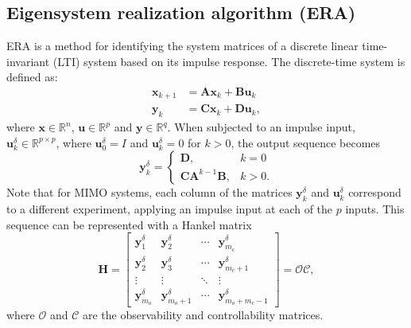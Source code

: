 \documentclass[../main.tex]{subfiles}
\begin{document}
\subsection{Eigensystem realization algorithm (ERA)}

ERA is a method for identifying the system matrices of a discrete linear time-invariant (LTI) system based on its impulse response\cite{juang1985,brunton2017}.  The discrete-time system is defined as:
\begin{equation}
\label{eq:discrete_system}
\begin{split}
    \bm{x}_{k+1} &= \bm{A} \bm{x}_k + \bm{B}\bm{u}_k  \\
    \bm{y}_{k} &= \bm{C} \bm{x}_k + \bm{D}\bm{u}_k,
\end{split}
\end{equation}
where $\bm{x} \in \mathbb{R}^n$, $\bm{u} \in \mathbb{R}^p$ and $\bm{y} \in \mathbb{R}^q$. When subjected to an impulse input, $\bm{u}_k^{\delta} \in \mathbb{R}^{p \times p} $, where $\bm{u}_0^{\delta}=I$ and $\bm{u}_k^\delta=0$ for $k>0$, the output sequence becomes
\begin{equation}
\label{eq:impulse_response}
    \bm{y}_k^{\delta} =  \begin{cases}
    \bm{D}, &k = 0 \\
    \bm{C}\bm{A}^{k-1}\bm{B}, &k > 0.
\end{cases}
\end{equation}
Note that for MIMO systems, each column of the matrices $\bm{y}^{\delta}_k$ and $\bm{u}_k^{\delta}$ correspond to a different experiment, applying an impulse input at each of the $p$ inputs. This sequence can be represented with a Hankel matrix
\begin{equation}
\label{eq:hankel}
    \bm{H} = \begin{bmatrix}
        \bm{y}_1^{\delta} & \bm{y}_2^{\delta} & \cdots & \bm{y}_{m_c}^{\delta}\\
        \bm{y}_2^{\delta} & \bm{y}_3^{\delta} & \cdots & \bm{y}_{m_c+1}^{\delta}\\
        \vdots & \vdots & \ddots & \vdots\\
        \bm{y}_{m_o}^{\delta} & \bm{y}_{m_o+1}^{\delta} & \cdots & \bm{y}_{m_o+m_c-1}^{\delta}
    \end{bmatrix} = \bm{\mathcal{OC}},
\end{equation}
where $\bm{\mathcal{O}}$ and $\bm{\mathcal{C}}$ are the observability and controllability matrices.
\end{document}
